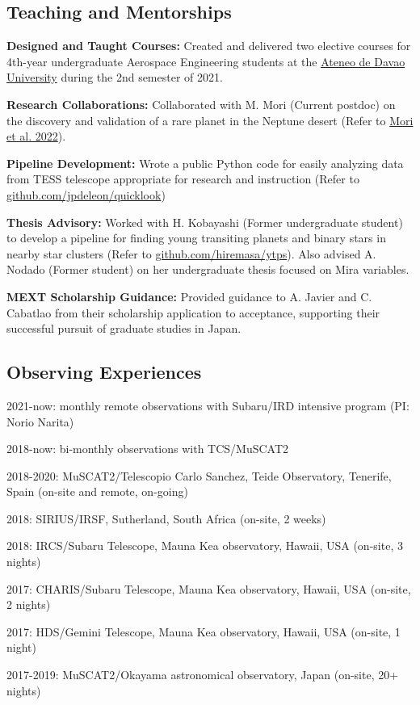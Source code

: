 \documentclass[12pt,letterpaper]{article}
\begin{document}
\subsection{Teaching and Mentorships}
\begin{list}{}{\cvlist}
    \item \textbf{Designed and Taught Courses:} Created and delivered two elective courses for 4th-year undergraduate Aerospace Engineering students at the \href{http://sea.addu.edu.ph/programs/aerospace-engineering/}{Ateneo de Davao University} during the 2nd semester of 2021.
    \item \textbf{Research Collaborations:} Collaborated with M. Mori (Current postdoc) on the discovery and validation of a rare planet in the Neptune desert (Refer to \href{https://ui.adsabs.harvard.edu/abs/2022AJ....163..298M/abstract}{Mori et al. 2022}).%
    \item \textbf{Pipeline Development:} Wrote a public Python code for easily analyzing data from TESS telescope appropriate for research and instruction (Refer to \href{https://github.com/jpdeleon/quicklook}{github.com/jpdeleon/quicklook})
    \item \textbf{Thesis Advisory:} Worked with H. Kobayashi (Former undergraduate student) to develop a pipeline for finding young transiting planets and binary stars in nearby star clusters (Refer to \href{https://github.com/hiremasa/ytps}{github.com/hiremasa/ytps}). Also advised A. Nodado (Former student) on her undergraduate thesis focused on Mira variables.
    \item \textbf{MEXT Scholarship Guidance:} Provided guidance to A. Javier and C. Cabatlao from their scholarship application to acceptance, supporting their successful pursuit of graduate studies in Japan.
\end{list}

\subsection{Observing Experiences}
\begin{list}{}{\cvlist}
    \item 2021-now: monthly remote observations with Subaru/IRD intensive program (PI: Norio Narita) 
    \item 2018-now: bi-monthly observations with TCS/MuSCAT2
    \item 2018-2020: MuSCAT2/Telescopio Carlo Sanchez, Teide Observatory, Tenerife, Spain (on-site and remote, on-going)
    \item 2018: SIRIUS/IRSF, Sutherland, South Africa (on-site, 2 weeks)
    \item 2018: IRCS/Subaru Telescope, Mauna Kea observatory, Hawaii, USA (on-site, 3 nights)
    \item 2017: CHARIS/Subaru Telescope, Mauna Kea observatory, Hawaii, USA (on-site, 2 nights)
    \item 2017: HDS/Gemini Telescope, Mauna Kea observatory, Hawaii, USA (on-site, 1 night)
    \item 2017-2019: MuSCAT2/Okayama astronomical observatory, Japan (on-site, 20+ nights)
\end{list}
\end{document}
